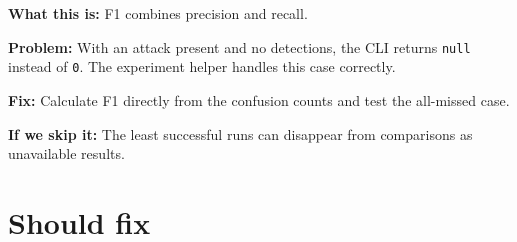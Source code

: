 \documentclass[11pt,a4paper]{article}
\begin{document}
\begin{enumerate}[series=findings]
\begin{minipage}[t]{\linewidth}
\textbf{What this is:} F1 combines precision and recall.

\textbf{Problem:} With an attack present and no detections, the CLI returns
\texttt{null} instead of \texttt{0}. The experiment helper handles this case
correctly.

\textbf{Fix:} Calculate F1 directly from the confusion counts and test the
all-missed case.

\textbf{If we skip it:} The least successful runs can disappear from comparisons
as unavailable results.
\end{minipage}

\end{enumerate}

\section*{Should fix}
\end{document}

